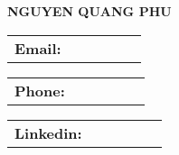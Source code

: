 \documentclass[letterpaper,11pt]{article}
\makeatletter
\newcommand{\resumeInfo}[2]{
  \vspace{-2pt}\item
  \begin{tabular}{p{3cm} p{4cm} p{4cm} p{4cm} p{4cm} p{4cm}}
      \textbf{\large#1} & \text{#2} \\
    \end{tabular}
}
\makeatother
\begin{document}

\begin{flushleft}
	\textbf{\Huge \scshape \textcolor{myblue}{NGUYEN QUANG PHU}} \\ \vspace{8pt}
  \resumeInfo{Email:}{nqphu1998@gmail.com}
  \resumeInfo{Phone:}{0939134813}
  \resumeInfo{Linkedin:}{linkedin.com/in/nqphu1998}
\end{flushleft}

%


\end{document}
